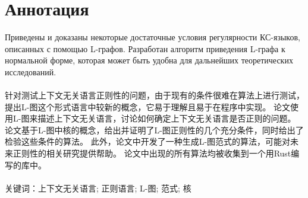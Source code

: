 \chapter*{Аннотация}

Приведены и доказаны некоторые достаточные условия регулярности КС-языков, описанных с помощью L-графов.
Разработан алгоритм приведения L-графа к нормальной форме, которая может быть удобна для дальнейших
теоретических исследований.
~ \\
~ \\
针对测试上下文无关语言正则性的问题，由于现有的条件很难在算法上进行测试，提出L-图这个形式语言中较新的概念，它易于理解且易于在程序中实现。
论文使用L-图来描述上下文无关语言，讨论如何确定上下文无关语言是否正则的问题。
论文基于L-图中核的概念，给出并证明了L-图正则性的几个充分条件，同时给出了检验这些条件的算法。
此外，论文中开发了一种生成L-图范式的算法，可能对未来正则性的相关研究提供帮助。
论文中出现的所有算法均被收集到一个用Rust编写的库中。
~ \\
~ \\
关键词：上下文无关语言; 正则语言; L-图; 范式; 核

\pagebreak